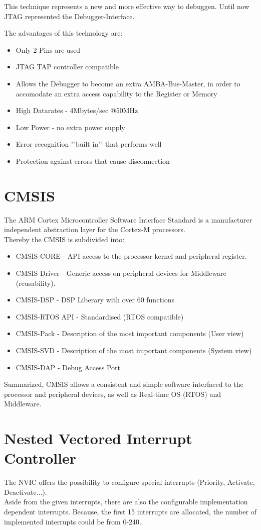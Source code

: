 This technique represents a new and more effective way to debuggen. Until now JTAG 
represented the Debugger-Interface.  


The advantages of this technology are:

\begin{itemize}
\item Only 2 Pins are used
\item JTAG TAP controller compatible
\item Allows the Debugger to become an extra AMBA-Bus-Master, in order to accomodate an extra 
access capability to the Register or Memory
\item High Datarates - 4Mbytes/sec @50MHz
\item Low Power - no extra power supply 
\item Error recognition "'built in"' that performs well
\item Protection against errors that cause disconnection
\end{itemize}  

\section{CMSIS}
The ARM Cortex Microcontroller Software Interface Standard is a manufacturer independent 
abstraction layer for the Cortex-M processors.\\
Thereby the CMSIS is subdivided into:
\begin{itemize}
\item CMSIS-CORE - API access to the processor kernel and peripheral register.
\item CMSIS-Driver - Generic access on peripheral devices for Middleware
			(reusability).
\item CMSIS-DSP - DSP Liberary with over 60 functions
\item CMSIS-RTOS API - Standardised (RTOS compatible)
\item CMSIS-Pack - Description of the most important components (User view)
\item CMSIS-SVD - Description of the most important components (System view)
\item CMSIS-DAP - Debug Access Port
\end{itemize}

Summarized, CMSIS allows a consistent and simple software interfaced to the processor 
and peripheral devices, as well as Real-time OS (RTOS) and Middleware.

\section{Nested Vectored Interrupt Controller}
The NVIC offers the possibility to configure special interrupts 
(Priority, Activate, Deactivate...). \\
Aside from the given interrupts, there are also the configurable implementation dependent interrupts.  
Because, the first 15 interrupts are allocated, the number of implemented interrupts could be from 0-240.

